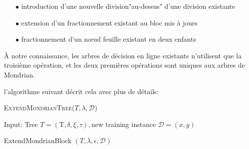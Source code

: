 \begin{itemize}
    \item[$\bullet$] introduction d'une nouvelle division"au-dessus" d'une division existante
    \item[$\bullet$] extension d'un fractionnement existant au bloc mis à jours
    \item[$\bullet$] fractionnement d'un nœud feuille existant en deux enfants
\end{itemize}

À notre connaissance, les arbres de décision en ligne existants n'utilisent que la troisième opération, et les deux premières opérations sont uniques aux arbres de Mondrian.

l'algorithme suivant décrit cela avec plus de détails:

{\fontsize{4}{4}\selectfont
\begin{algorithm}[h]
\caption{\textsc{ExtendMondrianTree($T,\lambda,\mathcal{D}$)}}
Input: Tree $T=(\mathrm{T}, \delta, \xi, \tau),$new training instance $\mathcal{D}=(x, y)$

ExtendMondrianBlock $(T, \lambda, \epsilon, \mathcal{D})$
\end{algorithm}
}
